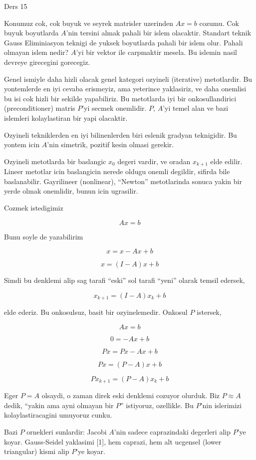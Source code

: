 \documentclass[12pt,fleqn]{article}\usepackage{../common}
\begin{document}
Ders 15

Konumuz cok, cok buyuk ve seyrek matrisler uzerinden $Ax = b$ cozumu. Cok
buyuk boyutlarda $A$'nin tersini almak pahali bir islem olacaktir. Standart
teknik Gauss Eliminiasyon teknigi de yuksek boyutlarda pahali bir islem
olur. Pahali olmayan islem nedir? $A$'yi bir vektor ile carpmaktir
mesela. Bu islemin nasil devreye girecegini gorecegiz.

Genel ismiyle daha hizli olacak genel kategori ozyineli (iterative)
metotlardir. Bu yontemlerde en iyi cevaba erismeyiz, ama yeterince
yaklasiriz, ve daha onemlisi bu isi cok hizli bir sekilde
yapabiliriz. Bu metotlarda iyi bir onkosullandirici (preconditioner)
matris $P$'yi secmek onemlidir. $P$, $A$'yi temel alan ve bazi islemleri
kolaylastiran bir yapi olacaktir. 

Ozyineli tekniklerden en iyi bilinenlerden biri eslenik gradyan
teknigidir. Bu yontem icin $A$'nin simetrik, pozitif kesin olmasi gerekir.

Ozyineli metotlarda bir baslangic $x_0$ degeri vardir, ve oradan $x_{k+1}$
elde edilir. Lineer metotlar icin baslangicin nerede oldugu onemli
degildir, sifirda bile baslanabilir. Gayrilineer (nonlinear), ``Newton''
metotlarinda sonuca yakin bir yerde olmak onemlidir, bunun icin ugrasilir.

Cozmek istedigimiz 

\[ Ax = b \]

Bunu soyle de yazabilirim 

\[ x = x - Ax + b \]

\[ x = (I - A)x + b \]

Simdi bu denklemi alip sag tarafi ``eski'' sol tarafi ``yeni'' olarak
temsil edersek,

\[ x_{k+1} = (I - A)x_k + b \]

elde ederiz. Bu onkosulsuz, basit bir ozyinelemedir. Onkosul $P$ istersek,

\[ Ax = b \]

\[ 0 = -Ax + b \]

\[ Px = Px - Ax + b \]

\[ Px = (P -A)x + b \]

\[ Px_{k+1} =  (P - A)x_k + b \]

Eger $P = A$ olsaydi, o zaman direk eski denklemi cozuyor olurduk.  
Biz $P
\approx A$ dedik, ``yakin ama ayni olmayan bir $P$'' istiyoruz,
ozellikle. Bu $P$'nin islerimizi kolaylastiracagini umuyoruz cunku.

Bazi $P$ ornekleri sunlardir: Jacobi $A$'nin sadece caprazindaki degerleri
alip $P$'ye koyar. Gauss-Seidel yaklasimi [1], hem caprazi, hem alt ucgensel
(lower triangular) kismi alip $P$'ye koyar.
\end{document}
